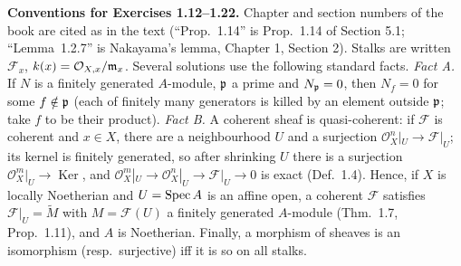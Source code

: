 \documentclass[11pt]{article}
\begin{document}
\noindent\textbf{Conventions for Exercises 1.12--1.22.} Chapter and section numbers of the book are cited as in the text (``Prop.~1.14'' is Prop.~1.14 of Section 5.1; ``Lemma~1.2.7'' is Nakayama's lemma, Chapter 1, Section 2). Stalks are written $\mathcal F_x$, $k(x)=\mathcal O_{X,x}/\mathfrak m_x$. Several solutions use the following standard facts. \emph{Fact A.} If $N$ is a finitely generated $A$-module, $\mathfrak p$ a prime and $N_\mathfrak p=0$, then $N_f=0$ for some $f\notin\mathfrak p$ (each of finitely many generators is killed by an element outside $\mathfrak p$; take $f$ to be their product). \emph{Fact B.} A coherent sheaf is quasi-coherent: if $\mathcal F$ is coherent and $x\in X$, there are a neighbourhood $U$ and a surjection $\mathcal O_X^n|_U\to\mathcal F|_U$; its kernel is finitely generated, so after shrinking $U$ there is a surjection $\mathcal O_X^m|_U\to\operatorname{Ker}$, and $\mathcal O_X^m|_U\to\mathcal O_X^n|_U\to\mathcal F|_U\to0$ is exact (Def.~1.4). Hence, if $X$ is locally Noetherian and $U=\operatorname{Spec} A$ is an affine open, a coherent $\mathcal F$ satisfies $\mathcal F|_U=\widetilde M$ with $M=\mathcal F(U)$ a finitely generated $A$-module (Thm.~1.7, Prop.~1.11), and $A$ is Noetherian. Finally, a morphism of sheaves is an isomorphism (resp.\ surjective) iff it is so on all stalks.
\end{document}
